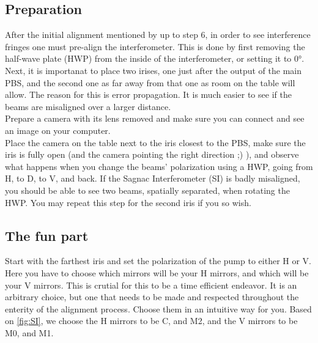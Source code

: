 \subsection{Preparation}
After the initial alignment mentioned by \cite{deny_hamel} up to step 6, in order to see interference fringes one must pre-align the interferometer. This is done by first removing the half-wave plate (HWP)
from the inside of the interferometer, or setting it to 0°.\\
Next, it is importanat to place two irises, one just after the output of the main PBS, and the second one as far away from that one as room on the table will allow.
The reason for this is error propagation. It is much easier to see if the beams are misaligned over a larger distance.\\
Prepare a camera with its lens removed and make sure you can connect and see an image on your computer.\\
Place the camera on the table next to the iris closest to the PBS, make sure the iris is fully open (and the camera pointing the right direction ;) ),
and observe what happens when you change the beams' polarization using a HWP, going from H, to D, to V, and back. If the Sagnac Interferometer (SI) is badly misaligned,
you should be able to see two beams, spatially separated, when rotating the HWP. You may repeat this step for the second iris if you so wish.\\
\subsection{The fun part}
Start with the farthest iris and set the polarization of the pump to either H or V. Here you have to choose which mirrors will be your H mirrors, and which will be your V mirrors.
This is crutial for this to be a time efficient endeavor. It is an arbitrary choice, but one that needs to be made and respected throughout the enterity of the alignment process.
Choose them in an intuitive way for you. Based on \ref{fig:SI}, we choose the H mirrors to be C, and M2, and the V mirrors to be M0, and M1.\par

